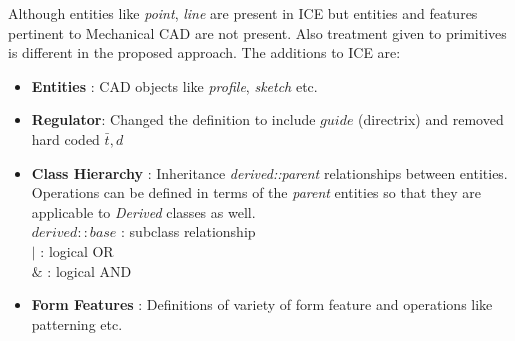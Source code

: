 Although entities like {\em point}, {\em line} are present in ICE but entities and features pertinent to Mechanical CAD are not present. Also treatment given to primitives is different in the proposed approach. The additions to ICE are:
\begin{itemize}[noitemsep,topsep=2pt,parsep=2pt,partopsep=2pt]
\item {\bf Entities} : CAD objects like {\em profile}, {\em sketch} etc.
\item {\bf Regulator}: Changed the definition to include $guide$ (directrix) and removed hard coded $\bar{t}, d$
\item {\bf Class Hierarchy} : Inheritance {\em derived::parent} relationships between entities. Operations can be defined in terms of the {\em parent} entities so that they are applicable to {\em Derived} classes as well.\\
		$derived::base$ : subclass relationship\\
		$|$ : logical OR\\
		$\&$ : logical AND
\item {\bf Form Features} : Definitions of variety of form feature and operations like patterning etc.
\end{itemize}


